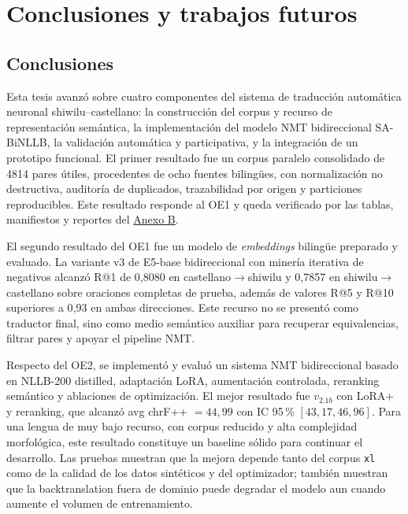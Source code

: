 \documentclass[12pt,a4paper,oneside]{book}
\begin{document}
\chapter{Conclusiones y trabajos futuros}\label{conclusiones-y-trabajos-futuros}

\section{Conclusiones}\label{conclusiones-1}

Esta tesis avanzó sobre cuatro componentes del sistema de traducción automática neuronal shiwilu--castellano: la construcción del corpus y recurso de representación semántica, la implementación del modelo NMT bidireccional SA-BiNLLB, la validación automática y participativa, y la integración de un prototipo funcional. El primer resultado fue un corpus paralelo consolidado de 4814 pares útiles, procedentes de ocho fuentes bilingües, con normalización no destructiva, auditoría de duplicados, trazabilidad por origen y particiones reproducibles. Este resultado responde al OE1 y queda verificado por las tablas, manifiestos y reportes del \hyperref[anexo-documento-reproducible]{Anexo B}.

El segundo resultado del OE1 fue un modelo de \emph{embeddings} bilingüe preparado y evaluado. La variante v3 de E5-base bidireccional con minería iterativa de negativos alcanzó R@1 de 0{,}8080 en castellano\(\rightarrow\)shiwilu y 0{,}7857 en shiwilu\(\rightarrow\)castellano sobre oraciones completas de prueba, además de valores R@5 y R@10 superiores a 0{,}93 en ambas direcciones. Este recurso no se presentó como traductor final, sino como medio semántico auxiliar para recuperar equivalencias, filtrar pares y apoyar el pipeline NMT.

Respecto del OE2, se implementó y evaluó un sistema NMT bidireccional basado en NLLB-200 distilled, adaptación LoRA, aumentación controlada, reranking semántico y ablaciones de optimización. El mejor resultado fue \(v_{2.1b}\) con LoRA+ y reranking, que alcanzó avg chrF++ \(=44{,}99\) con IC 95\,\% \([43{,}17, 46{,}96]\). Para una lengua de muy bajo recurso, con corpus reducido y alta complejidad morfológica, este resultado constituye un baseline sólido para continuar el desarrollo. Las pruebas muestran que la mejora depende tanto del corpus \texttt{xl} como de la calidad de los datos sintéticos y del optimizador; también muestran que la backtranslation fuera de dominio puede degradar el modelo aun cuando aumente el volumen de entrenamiento.
\end{document}
